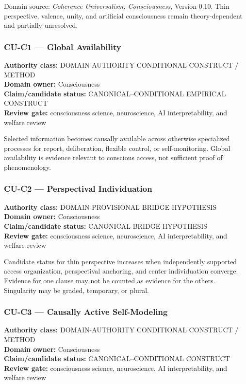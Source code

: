 \documentclass[
  11pt,
]{article}
\begin{document}
Domain source: \emph{Coherence Universalism: Consciousness}, Version
0.10. Thin perspective, valence, unity, and artificial consciousness
remain theory-dependent and partially unresolved.

\subsubsection{CU-C1 --- Global
Availability}\label{cu-c1-global-availability}

\textbf{Authority class:} DOMAIN-AUTHORITY CONDITIONAL CONSTRUCT /
METHOD\\
\textbf{Domain owner:} Consciousness\\
\textbf{Claim/candidate status:} CANONICAL--CONDITIONAL EMPIRICAL
CONSTRUCT\\
\textbf{Review gate:} consciousness science, neuroscience, AI
interpretability, and welfare review

Selected information becomes causally available across otherwise
specialized processes for report, deliberation, flexible control, or
self-monitoring. Global availability is evidence relevant to conscious
access, not sufficient proof of phenomenology.

\subsubsection{CU-C2 --- Perspectival
Individuation}\label{cu-c2-perspectival-individuation}

\textbf{Authority class:} DOMAIN-PROVISIONAL BRIDGE HYPOTHESIS\\
\textbf{Domain owner:} Consciousness\\
\textbf{Claim/candidate status:} CANONICAL BRIDGE HYPOTHESIS\\
\textbf{Review gate:} consciousness science, neuroscience, AI
interpretability, and welfare review

Candidate status for thin perspective increases when independently
supported access organization, perspectival anchoring, and center
individuation converge. Evidence for one clause may not be counted as
evidence for the others. Singularity may be graded, temporary, or
plural.

\subsubsection{CU-C3 --- Causally Active
Self-Modeling}\label{cu-c3-causally-active-self-modeling}

\textbf{Authority class:} DOMAIN-AUTHORITY CONDITIONAL CONSTRUCT /
METHOD\\
\textbf{Domain owner:} Consciousness\\
\textbf{Claim/candidate status:} CANONICAL--CONDITIONAL CONSTRUCT\\
\textbf{Review gate:} consciousness science, neuroscience, AI
interpretability, and welfare review
\end{document}
